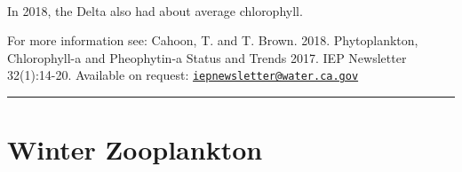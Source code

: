 \documentclass[
]{book}
\begin{document}
\begin{panel-grid}
\begin{columns-nocenter}
\begin{column800}
\end{column800}

\begin{column40}

~

\end{column40}

\begin{column800}

In 2018, the Delta also had about average chlorophyll.

\end{column800}

\end{columns-nocenter}

\end{panel-grid}

\begin{disclaimer}
For more information see: Cahoon, T. and T. Brown. 2018. Phytoplankton,
Chlorophyll-a and Pheophytin-a Status and Trends 2017. IEP Newsletter
32(1):14-20. Available on request:
\href{mailto:iepnewsletter@water.ca.gov}{\nolinkurl{iepnewsletter@water.ca.gov}}
\end{disclaimer}

\begin{center}\rule{0.5\linewidth}{0.5pt}\end{center}

\hypertarget{winter-zooplankton}{%
\section{Winter Zooplankton}\label{winter-zooplankton}}
\end{document}
